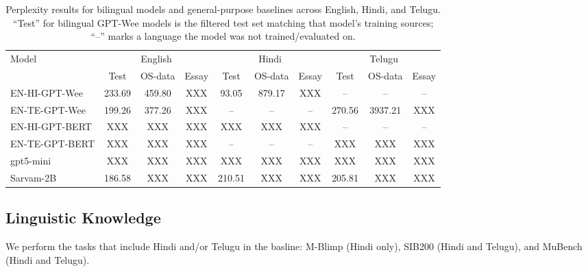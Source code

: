 \documentclass[11pt]{article}
\begin{document}
\begin{table}[t]
\centering
\footnotesize
\begin{tabular}{lccccccccc}
\hline
\multirow{2}{*}{Model} & \multicolumn{3}{c}{English} & \multicolumn{3}{c}{Hindi} &  \multicolumn{3}{c}{Telugu}\\
\cline{2-4} \cline{5-7} \cline{8-10}
 & Test & OS-data & Essay & Test & OS-data & Essay & Test & OS-data & Essay \\
\hline
EN-HI-GPT-Wee & 233.69 & 459.80 & XXX & 93.05 & 879.17 & XXX & -- & -- & -- \\
EN-TE-GPT-Wee & 199.26 & 377.26 & XXX & -- & -- & -- & 270.56 & 3937.21 & XXX \\
EN-HI-GPT-BERT & XXX & XXX & XXX & XXX & XXX & XXX & -- & -- & -- \\
EN-TE-GPT-BERT & XXX & XXX & XXX & -- & -- & -- & XXX & XXX & XXX \\
\hline
gpt5-mini & XXX & XXX & XXX & XXX & XXX & XXX & XXX & XXX & XXX \\
Sarvam-2B & 186.58 & XXX & XXX & 210.51 & XXX & XXX & 205.81 & XXX & XXX \\
\hline
\end{tabular}
\caption{Perplexity results for bilingual models and general-purpose baselines across English, Hindi, and Telugu. ``Test'' for bilingual GPT-Wee models is the filtered test set matching that model's training sources; ``--'' marks a language the model was not trained/evaluated on.}
\label{tab:bilingual-ppl}
\end{table}

\subsection{Linguistic Knowledge}

We perform the tasks that include Hindi and/or Telugu in the basline: M-Blimp (Hindi only), SIB200 (Hindi and Telugu), and MuBench (Hindi and Telugu).
\end{document}
